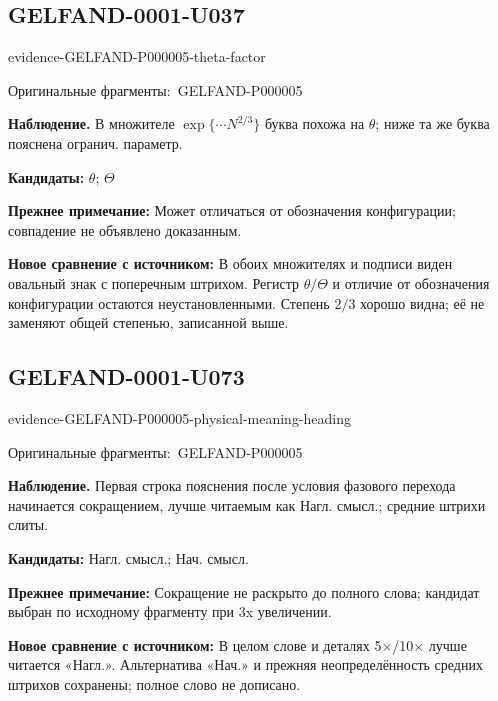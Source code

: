 \documentclass[11pt]{article}
\newcommand{\EvidenceBlock}[4]{%
 \par\smallskip\noindent\begin{minipage}{\linewidth}
 \begin{minipage}[t]{.47\linewidth}\vspace{0pt}\centering
 \csname evidence-#1-#2\endcsname\par
 {\scriptsize\SourceCropCaption\ #1}\par
 \end{minipage}\hfill
 \begin{minipage}[t]{.49\linewidth}\vspace{0pt}\raggedright
 {\small\color{orange!65!black}\textbf{#4} #3}\par
 \end{minipage}
 \end{minipage}\par\smallskip}
\newcommand{\SourceCropCaption}{Оригинальные фрагменты:}\newcommand{\ReadingCaption}{Сомнительное чтение.}\newcommand{\IncompleteCaption}{Неразобранный фрагмент.}\newcommand{\DiagramCaption}{Рисунок и набранное описание.}
\begin{document}
\subsection*{GELFAND-0001-U037}
\EvidenceBlock{GELFAND-P000005}{theta-factor}{В множителе \(\exp\{\cdots N^{2/3}\}\) буква похожа на \(\theta\); ниже та же буква пояснена огранич. параметр.}{Наблюдение.}
\par\smallskip\noindent\textbf{Кандидаты: } \(\theta\); \(\Theta\)\par
\par\smallskip\noindent\textbf{Прежнее примечание: } Может отличаться от обозначения конфигурации; совпадение не объявлено доказанным.\par
\par\smallskip\noindent\textbf{Новое сравнение с источником: } В обоих множителях и подписи виден овальный знак с поперечным штрихом. Регистр \(\theta/\Theta\) и отличие от обозначения конфигурации остаются неустановленными. Степень \(2/3\) хорошо видна; её не заменяют общей степенью, записанной выше.\par

\subsection*{GELFAND-0001-U073}
\EvidenceBlock{GELFAND-P000005}{physical-meaning-heading}{Первая строка пояснения после условия фазового перехода начинается сокращением, лучше читаемым как Нагл. смысл.; средние штрихи слиты.}{Наблюдение.}
\par\smallskip\noindent\textbf{Кандидаты: } Нагл. смысл.; Нач. смысл.\par
\par\smallskip\noindent\textbf{Прежнее примечание: } Сокращение не раскрыто до полного слова; кандидат выбран по исходному фрагменту при 3x увеличении.\par
\par\smallskip\noindent\textbf{Новое сравнение с источником: } В целом слове и деталях 5×/10× лучше читается «Нагл.». Альтернатива «Нач.» и прежняя неопределённость средних штрихов сохранены; полное слово не дописано.\par
\end{document}
